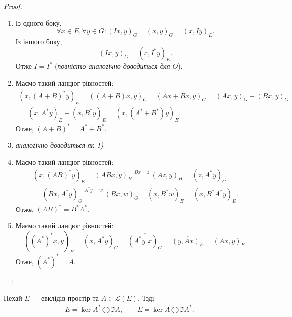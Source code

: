 \documentclass{math_library}
\begin{document}
\begin{proof}
\begin{enumerate}[topsep=0pt, wide=0pt, label={\arabic*)}, start=0]
\item Із одного боку,
\[
\forall x \in E, \forall y \in G: (Ix,y)_G = (x,y)_G = (x, Iy)_E.
\] 
Із іншого боку, 
\[ 
(Ix,y)_G = (x,I^*y)_E.
\] 
Отже $I = I^*$ (\textit{повністю аналогічно доводиться для $O$}).

\item Маємо такий ланцюг рівностей:
\begin{align*}
(x,(A+B)^*y)_E = ((A+B)x,y)_G = (Ax+Bx,y)_G = (Ax,y)_G + (Bx, y)_G \\ = (x,A^* y)_E+(x,B^* y)_E = (x,(A^*+B^*)y)_E.
\end{align*}
Отже, $(A+B)^* = A^* + B^*$.
\item \textit{аналогічно доводиться як 1)}
\item Маємо такий ланцюг рівностей: 
\begin{align*}
(x,(AB)^*y)_E = (ABx, y)_H \overset{Bx = z}{=} (Az,y)_H = (z, A^*y)_G \\ = (Bx, A^*y)_G \overset{A^* y = w}{=} (Bx,w)_G = (x, B^* w)_E = (x, B^* A^* y)_E.
\end{align*}
Отже, $(AB)^* = B^* A^*$.

\item Маємо такий ланцюг рівностей:
\[
((A^*)^*x,y)_E = (x,A^*y)_G = \overline{(A^*y,x)_G} = \overline{(y,Ax)_E} = (Ax,y)_E.
\]
Отже, $(A^*)^* = A$. \qedhere
\end{enumerate}
\end{proof}

\begin{theorem}
\label{euclid_decomposition}
Нехай $E$ --- евклідів простір та $A \in \mathcal{L}(E)$. Тоді
\begin{align*}
E = \ker A^* \bigoplus \Im A, \qquad E = \ker A \bigoplus \Im A^*.
\end{align*}
\end{theorem}
\end{document}
